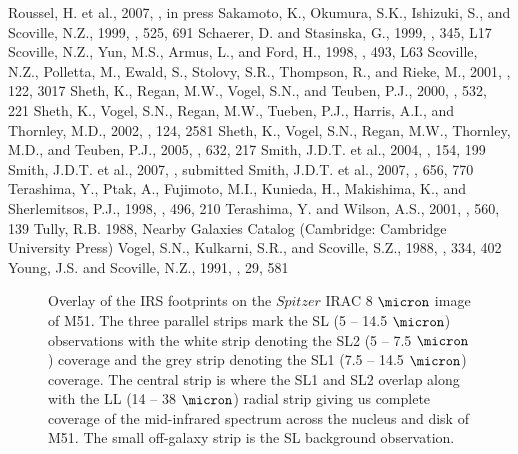 \documentclass[12pt,preprint]{aastex}
\begin{document}
\begin{thebibliography}{}
 Roussel, H. et al., 2007, \apjs, in press
 Sakamoto, K., Okumura, S.K., Ishizuki, S., and Scoville, N.Z., 1999, \apj, 525, 691
 Schaerer, D. and Stasinska, G., 1999, \aap, 345, L17
 Scoville, N.Z., Yun, M.S., Armus, L., and Ford, H., 1998, \apj, 493, L63 
 Scoville, N.Z., Polletta, M., Ewald, S., Stolovy, S.R., Thompson, R., and Rieke, M., 2001, \aj, 122, 3017
 Sheth, K., Regan, M.W., Vogel, S.N., and Teuben, P.J., 2000, \apj, 532, 221 
 Sheth, K., Vogel, S.N., Regan, M.W., Tueben, P.J., Harris, A.I., and Thornley, M.D., 2002, \aj, 124, 2581
 Sheth, K., Vogel, S.N., Regan, M.W., Thornley, M.D., and Teuben, P.J., 2005, \apj, 632, 217
 Smith, J.D.T. et al., 2004, \apjs, 154, 199
 Smith, J.D.T. et al., 2007, \pasp, submitted
 Smith, J.D.T. et al., 2007, \apj, 656, 770
 Terashima, Y., Ptak, A., Fujimoto, M.I., Kunieda, H., Makishima, K., and Sherlemitsos, P.J., 1998, \apj, 496, 210
 Terashima, Y. and Wilson, A.S., 2001, \apj, 560, 139
 Tully, R.B. 1988, Nearby Galaxies Catalog (Cambridge: Cambridge University Press)
 Vogel, S.N., Kulkarni, S.R., and Scoville, S.Z., 1988, \nat, 334, 402
 Young, J.S. and Scoville, N.Z., 1991, \araa, 29, 581
\end{thebibliography}

\clearpage

\begin{figure}
\caption{Overlay of the IRS footprints on the $Spitzer$ IRAC 8 $\micron$ image of M51.  
The three parallel strips mark the SL (5 -- 14.5 $\micron$) observations with the white 
strip denoting the SL2 (5 -- 7.5 $\micron$) coverage and the grey strip 
denoting the SL1 (7.5 -- 14.5 $\micron$) coverage.  The central strip is where the SL1
and SL2 overlap along with the LL (14 -- 38 $\micron$) radial strip giving us complete coverage of the 
mid-infrared spectrum across the nucleus and disk of M51.  
The small off-galaxy strip is the SL background observation.}
\label{figure-1}
\end{figure}
\end{document}
